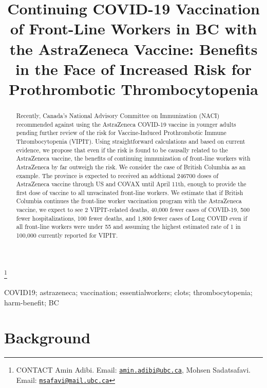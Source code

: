 \documentclass[]{interact}
\theoremstyle{plain}%
\theoremstyle{definition}
\theoremstyle{remark}
\begin{document}

\title{Continuing COVID-19 Vaccination of Front-Line Workers in BC with
the AstraZeneca Vaccine: Benefits in the Face of Increased Risk for
Prothrombotic Thrombocytopenia}


\author{
}

\thanks{CONTACT Amin
Adibi. Email: \href{mailto:amin.adibi@ubc.ca}{\nolinkurl{amin.adibi@ubc.ca}}, Mohsen
Sadatsafavi. Email: \href{mailto:msafavi@mail.ubc.ca}{\nolinkurl{msafavi@mail.ubc.ca}}}

\maketitle

\begin{abstract}
Recently, Canada's National Advisory Committee on Immunization (NACI)
recommended against using the AstraZeneca COVID-19 vaccine in younger
adults pending further review of the risk for Vaccine-Induced
Prothrombotic Immune Thrombocytopenia (VIPIT). Using straightforward
calculations and based on current evidence, we propose that even if the
risk is found to be causally related to the AstraZeneca vaccine, the
benefits of continuing immunization of front-line workers with
AstraZeneca by far outweigh the risk. We consider the case of British
Columbia as an example. The province is expected to received an
addtional 246700 doses of AstraZeneca vaccine through US and COVAX until
April 11th, enough to provide the first dose of vaccine to all
unvacinated front-line workers. We estimate that if British Columbia
continues the front-line worker vaccination program with the AstraZeneca
vaccine, we expect to see 2 VIPIT-related deaths, 40,000 fewer cases of
COVID-19, 500 fewer hospitalizations, 100 fewer deaths, and 1,800 fewer
cases of Long COVID even if all front-line workers were under 55 and
assuming the highest estimated rate of 1 in 100,000 currently reported
for VIPIT.
\end{abstract}

\begin{keywords}
COVID19; astrazeneca; vaccination; essentialworkers; clots;
thrombocytopenia; harm-benefit; BC
\end{keywords}

\hypertarget{background}{%
\section{Background}\label{background}}
\end{document}
